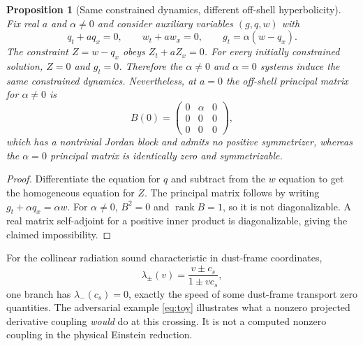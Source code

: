 \documentclass[11pt,a4paper]{article}
\newtheorem{proposition}[theorem]{Proposition}
\begin{document}
\begin{proposition}[Same constrained dynamics, different off-shell hyperbolicity]\label{prop:underdet}
Fix real $a$ and $\alpha\ne0$ and consider auxiliary variables $(g,q,w)$ with
\begin{equation}\label{eq:toy}
q_t+a q_x=0,\qquad w_t+a w_x=0,\qquad
g_t=\alpha(w-q_x).
\end{equation}
The constraint $Z=w-q_x$ obeys $Z_t+aZ_x=0$. For every initially constrained solution, $Z=0$ and $g_t=0$. Therefore the $\alpha\ne0$ and $\alpha=0$ systems induce the same constrained dynamics. Nevertheless, at $a=0$ the off-shell principal matrix for $\alpha\ne0$ is
\[B(0)=\begin{pmatrix}0&\alpha&0\\0&0&0\\0&0&0\end{pmatrix},\]
which has a nontrivial Jordan block and admits no positive symmetrizer, whereas the $\alpha=0$ principal matrix is identically zero and symmetrizable.
\end{proposition}
\begin{proof}Differentiate the equation for $q$ and subtract from the $w$ equation to get the homogeneous equation for $Z$. The principal matrix follows by writing $g_t+\alpha q_x=\alpha w$. For $\alpha\ne0$, $B^2=0$ and $\operatorname{rank}B=1$, so it is not diagonalizable. A real matrix self-adjoint for a positive inner product is diagonalizable, giving the claimed impossibility.\end{proof}

For the collinear radiation sound characteristic in dust-frame coordinates,
\begin{equation}\label{eq:acousticSpeed}
\lambda_\pm(v)=\frac{v\pm c_s}{1\pm vc_s},
\end{equation}
one branch has $\lambda_-(c_s)=0$, exactly the speed of some dust-frame transport zero quantities. The adversarial example \eqref{eq:toy} illustrates what a nonzero projected derivative coupling \emph{would} do at this crossing. It is not a computed nonzero coupling in the physical Einstein reduction.
\end{document}
